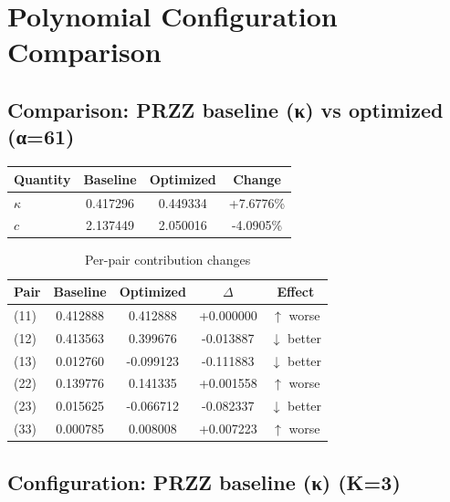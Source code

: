 
\section{Polynomial Configuration Comparison}

\subsection{Comparison: PRZZ baseline (κ) vs optimized (α=61)}

\begin{table}[h]
\centering
\begin{tabular}{lccc}
\hline
Quantity & Baseline & Optimized & Change \\
\hline
$\kappa$ & 0.417296 & 0.449334 & +7.6776\% \\
$c$ & 2.137449 & 2.050016 & -4.0905\% \\
\hline
\end{tabular}
\end{table}

\begin{table}[h]
\centering
\caption{Per-pair contribution changes}
\begin{tabular}{lcccc}
\hline
Pair & Baseline & Optimized & $\Delta$ & Effect \\
\hline
(11) & 0.412888 & 0.412888 & +0.000000 & $\uparrow$ worse \\
(12) & 0.413563 & 0.399676 & -0.013887 & $\downarrow$ better \\
(13) & 0.012760 & -0.099123 & -0.111883 & $\downarrow$ better \\
(22) & 0.139776 & 0.141335 & +0.001558 & $\uparrow$ worse \\
(23) & 0.015625 & -0.066712 & -0.082337 & $\downarrow$ better \\
(33) & 0.000785 & 0.008008 & +0.007223 & $\uparrow$ worse \\
\hline
\end{tabular}
\end{table}

\newpage
\subsection{Configuration: PRZZ baseline (κ) (K=3)}


